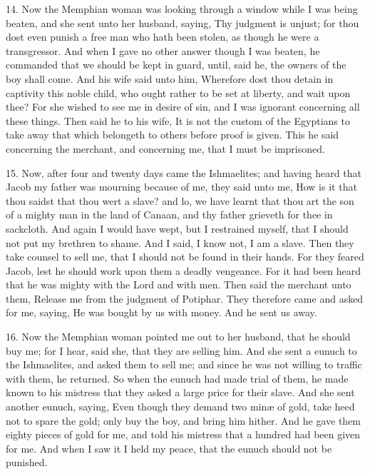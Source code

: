 14. Now the Memphian woman was looking through a window while I was being beaten, and she sent unto her husband, saying, Thy judgment is unjust; for thou dost even punish a free man who hath been stolen, as though he were a transgressor. And when I gave no other answer though I was beaten, he commanded that we should be kept in guard, until, said he, the owners of the boy shall come. And his wife said unto him, Wherefore dost thou detain in captivity this noble child, who ought rather to be set at liberty, and wait upon thee? For she wished to see me in desire of sin, and I was ignorant concerning all these things. Then said he to his wife, It is not the custom of the Egyptians to take away that which belongeth to others before proof is given. This he said concerning the merchant, and concerning me, that I must be imprisoned.

15. Now, after four and twenty days came the Ishmaelites; and having heard that Jacob my father was mourning because of me, they said unto me, How is it that thou saidst that thou wert a slave? and lo, we have learnt that thou art the son of a mighty man in the land of Canaan, and thy father grieveth for thee in sackcloth. And again I would have wept, but I restrained myself, that I should not put my brethren to shame. And I said, I know not, I am a slave. Then they take counsel to sell me, that I should not be found in their hands. For they feared Jacob, lest he should work upon them a deadly vengeance. For it had been heard that he was mighty with the Lord and with men. Then said the merchant unto them, Release me from the judgment of Potiphar. They therefore came and asked for me, saying, He was bought by us with money. And he sent us away.

16. Now the Memphian woman pointed me out to her husband, that he should buy me; for I hear, said she, that they are selling him. And she sent a eunuch to the Ishmaelites, and asked them to sell me; and since he was not willing to traffic with them, he returned. So when the eunuch had made trial of them, he made known to his mistress that they asked a large price for their slave. And she sent another eunuch, saying, Even though they demand two minæ of gold, take heed not to spare the gold; only buy the boy, and bring him hither. And he gave them eighty pieces of gold for me, and told his mistress that a hundred had been given for me. And when I saw it I held my peace, that the eunuch should not be punished.

